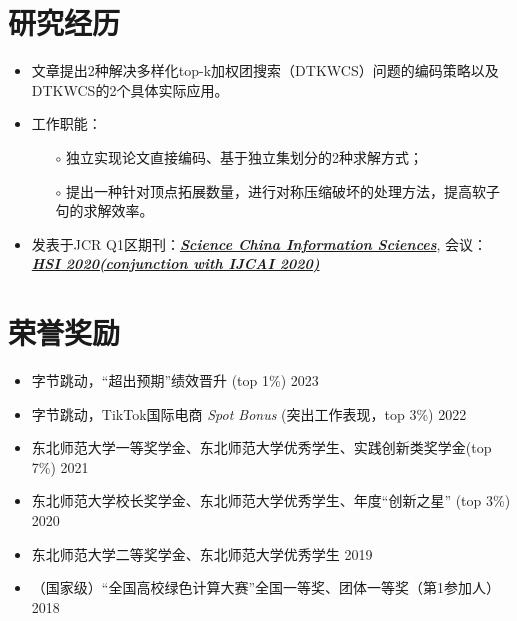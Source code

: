 \documentclass{resume}
\begin{document}
\section{研究经历}
\begin{itemize}[parsep=0.3ex] \normalsize
    \item 文章提出2种解决多样化top-k加权团搜索（DTKWCS）问题的编码策略以及DTKWCS的2个具体实际应用。
    \item 工作职能：
        \begin{itemize}
          \item[$\circ$] 独立实现论文直接编码、基于独立集划分的2种求解方式；
          \item[$\circ$] 提出一种针对顶点拓展数量，进行对称压缩破坏的处理方法，提高软子句的求解效率。
        \end{itemize}
    \item 发表于JCR Q1区期刊：\textbf{\href{http://scis.scichina.com}{\textit{Science China Information Sciences}}}, 
    会议：\textbf{\href{https://hsi-workshop.github.io/hsi2020-website/program.html}{\textit{HSI 2020(conjunction with IJCAI 2020)}}}
\end{itemize}

\section{荣誉奖励}
\begin{itemize}[parsep=0.2ex] \normalsize
    \item 字节跳动，“超出预期”绩效晋升 (top 1\%) \hfill 2023
    \item 字节跳动，TikTok国际电商 \textit{Spot Bonus} (突出工作表现，top 3\%) \hfill 2022
    \item 东北师范大学一等奖学金、东北师范大学优秀学生、实践创新类奖学金(top 7\%)  \hfill 2021
    \item 东北师范大学校长奖学金、东北师范大学优秀学生、年度“创新之星” (top 3\%)  \hfill 2020
    \item 东北师范大学二等奖学金、东北师范大学优秀学生  \hfill 2019
    \item （国家级）“全国高校绿色计算大赛”全国一等奖、团体一等奖（第1参加人）\hfill 2018
\end{itemize}
\end{document}
